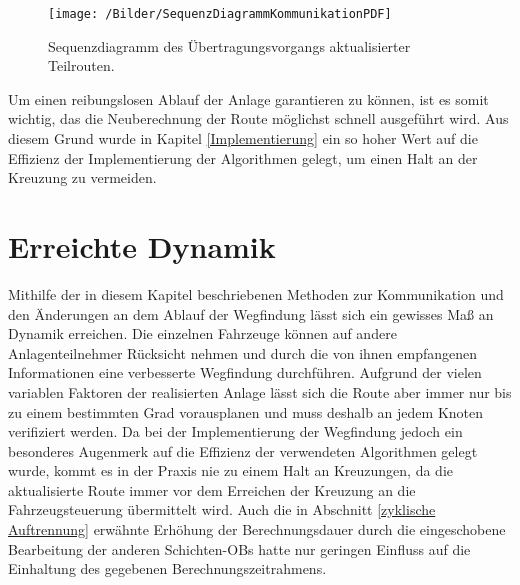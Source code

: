 		\begin{figure}[h]
			\centering
			\texttt{[image: /Bilder/SequenzDiagrammKommunikationPDF]}
			\vspace{0.2cm}
			\caption{Sequenzdiagramm des Übertragungsvorgangs aktualisierter Teilrouten.}
		\end{figure}
		
		Um einen reibungslosen Ablauf der Anlage garantieren zu können, ist es somit wichtig, das die Neuberechnung der Route möglichst schnell ausgeführt wird. Aus diesem Grund wurde in Kapitel \ref{Implementierung} ein so hoher Wert auf die Effizienz der Implementierung der Algorithmen gelegt, um einen Halt an der Kreuzung zu vermeiden.
		
\section{Erreichte Dynamik}
	
	Mithilfe der in diesem Kapitel beschriebenen Methoden zur Kommunikation und den Änderungen an dem Ablauf der Wegfindung lässt sich ein gewisses Maß an Dynamik erreichen. Die einzelnen Fahrzeuge können auf andere Anlagenteilnehmer Rücksicht nehmen und durch die von ihnen empfangenen Informationen eine verbesserte Wegfindung durchführen. Aufgrund der vielen variablen Faktoren der realisierten Anlage lässt sich die Route aber immer nur bis zu einem bestimmten Grad vorausplanen und muss deshalb an jedem Knoten verifiziert werden. Da bei der Implementierung der Wegfindung jedoch ein besonderes Augenmerk auf die Effizienz der verwendeten Algorithmen gelegt wurde, kommt es in der Praxis nie zu einem Halt an Kreuzungen, da die aktualisierte Route immer vor dem Erreichen der Kreuzung an die Fahrzeugsteuerung übermittelt wird. Auch die in Abschnitt \ref{zyklische Auftrennung} erwähnte Erhöhung der Berechnungsdauer durch die eingeschobene Bearbeitung der anderen Schichten-\ac{OB}s hatte nur geringen Einfluss auf die Einhaltung des gegebenen Berechnungszeitrahmens.
